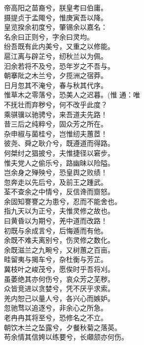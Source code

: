 \documentclass[]{article}
\begin{document}
帝高阳之苗裔兮，朕皇考曰伯庸。\\
摄提贞于孟陬兮，惟庚寅吾以降。\\
皇览揆余初度兮，肇锡余以嘉名：\\
名余曰正则兮，字余曰灵均。\\
纷吾既有此内美兮，又重之以修能。\\
扈江离与辟芷兮，纫秋兰以为佩。\\
汩余若将不及兮，恐年岁之不吾与。\\
朝搴阰之木兰兮，夕揽洲之宿莽。\\
日月忽其不淹兮，春与秋其代序。\\
惟草木之零落兮，恐美人之迟暮。(惟 通：唯\\
不抚壮而弃秽兮，何不改乎此度？\\
乘骐骥以驰骋兮，来吾道夫先路！\\
昔三后之纯粹兮，固众芳之所在。\\
杂申椒与菌桂兮，岂惟纫夫蕙茝！\\
彼尧、舜之耿介兮，既遵道而得路。\\
何桀纣之猖披兮，夫惟捷径以窘步。\\
惟夫党人之偷乐兮，路幽昧以险隘。\\
岂余身之殚殃兮，恐皇舆之败绩！\\
忽奔走以先后兮，及前王之踵武。\\
荃不查余之中情兮，反信谗而齌怒。\\
余固知謇謇之为患兮，忍而不能舍也。\\
指九天以为正兮，夫惟灵修之故也。\\
曰黄昏以为期兮，羌中道而改路！\\
初既与余成言兮，后悔遁而有他。\\
余既不难夫离别兮，伤灵修之数化。\\
余既滋兰之九畹兮，又树蕙之百亩。\\
畦留夷与揭车兮，杂杜衡与芳芷。\\
冀枝叶之峻茂兮，愿俟时乎吾将刈。\\
虽萎绝其亦何伤兮，哀众芳之芜秽。\\
众皆竞进以贪婪兮，凭不厌乎求索。\\
羌内恕己以量人兮，各兴心而嫉妒。\\
忽驰骛以追逐兮，非余心之所急。\\
老冉冉其将至兮，恐修名之不立。\\
朝饮木兰之坠露兮，夕餐秋菊之落英。\\
苟余情其信姱以练要兮，长顑颔亦何伤。\\
\end{document}
